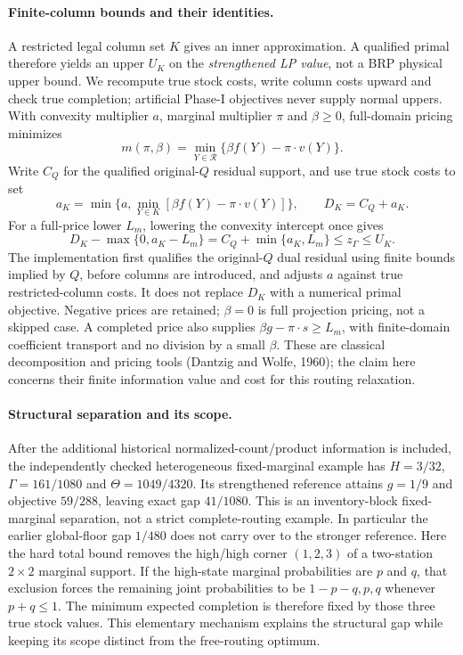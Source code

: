 \paragraph{Finite-column bounds and their identities.}
A restricted legal column set $K$ gives an inner approximation. A qualified
primal therefore yields an upper $U_K$ on the \emph{strengthened LP value},
not a BRP physical upper bound. We recompute true stock costs, write column
costs upward and check true completion; artificial Phase-I objectives never
supply normal uppers. With convexity multiplier $a$, marginal multiplier
$\pi$ and $\beta\ge0$, full-domain pricing minimizes
\[
 m(\pi,\beta)=\min_{Y\in\mathcal R}
        \{\beta f(Y)-\pi\cdot v(Y)\}.
\]
Write $C_Q$ for the qualified original-$Q$ residual support, and use true
stock costs to set
\[
 a_K=\min\bigl\{a,\min_{Y\in K}[\beta f(Y)-\pi\cdot v(Y)]\bigr\},
 \qquad D_K=C_Q+a_K.
\]
For a full-price lower $L_m$, lowering the convexity intercept once gives
\[
 D_K-\max\{0,a_K-L_m\}=C_Q+\min\{a_K,L_m\}\le z_\Gamma\le U_K.
\]
The implementation first qualifies the original-$Q$ dual residual using
finite bounds implied by $Q$, before columns are introduced, and adjusts
$a$ against true restricted-column costs. It does not replace $D_K$ with a
numerical primal objective. Negative prices are retained; $\beta=0$ is full
projection pricing, not a skipped case. A completed price also supplies
$\beta g-\pi\cdot s\ge L_m$, with finite-domain coefficient transport and
no division by a small $\beta$. These are classical decomposition and
pricing tools (Dantzig and Wolfe, 1960); the claim here concerns their finite
information value and cost for this routing relaxation.

\paragraph{Structural separation and its scope.}
After the additional historical normalized-count/product information is
included, the independently checked heterogeneous fixed-marginal example
has $H=3/32$, $\Gamma=161/1080$ and $\Theta=1049/4320$. Its strengthened
reference attains $g=1/9$ and objective $59/288$, leaving exact gap
$41/1080$. This is an inventory-block fixed-marginal separation, not a
strict complete-routing example. In particular the earlier global-floor
gap $1/480$ does not carry over to the stronger reference. Here the hard
total bound removes the high/high corner $(1,2,3)$ of a two-station
$2\times2$ marginal support. If the high-state marginal probabilities
are $p$ and $q$, that exclusion forces the remaining joint probabilities
to be $1-p-q,p,q$ whenever $p+q\le1$. The minimum expected completion is
therefore fixed by those three true stock values. This elementary mechanism
explains the structural gap while keeping its scope distinct from the
free-routing optimum.

